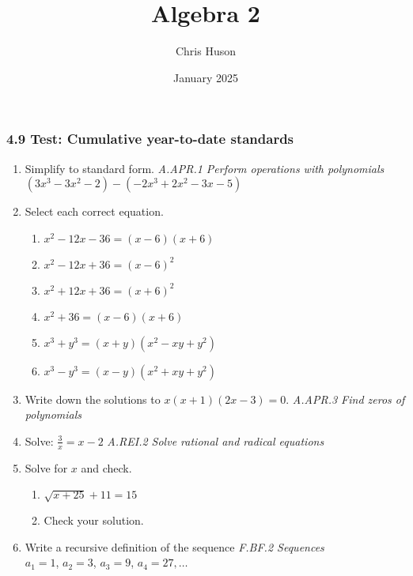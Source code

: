 \documentclass[12pt, twoside]{article}
\title{Algebra 2}
\author{Chris Huson}
\date{January 2025}
\begin{document}
\subsubsection*{4.9 Test: Cumulative year-to-date standards}
\begin{enumerate}[itemsep=0.5cm]

\item Simplify to standard form. \hfill \emph{A.APR.1 Perform operations with polynomials} \\[0.25cm]
$(3x^3 - 3x^2 - 2) - (- 2x^3 + 2x^2 - 3x - 5)$ \vspace{2cm}

\item Select each correct equation.
\begin{multicols}{2}
    \begin{enumerate}
    \item $x^2 - 12x - 36 = (x-6)(x+6)$
    \item $x^2 - 12x + 36 = (x-6)^2$
    \item $x^2 + 12x + 36 = (x+6)^2$
    \item $x^2 + 36 = (x-6)(x+6)$
    \item \(x^3 + y^3 = (x + y)(x^2 - xy + y^2)\)
    \item \(x^3 - y^3 = (x - y)(x^2 + xy + y^2)\)
    \end{enumerate}
\end{multicols}

\item Write down the solutions to $x(x + 1)(2x - 3) = 0$. \hfill \emph{A.APR.3 Find zeros of polynomials}
\vspace{2cm} 

\item Solve: $\displaystyle \frac{3}{x} = x-2$ \hfill \emph{A.REI.2 Solve rational and radical equations} \vspace{3cm} 

\item Solve for $x$ and check.
    \begin{multicols}{2}
    \begin{enumerate}[itemsep=0.5cm]
        \item  $\sqrt{x+25} + 11 = 15$
        \item Check your solution.
    \end{enumerate}
    \end{multicols}

\newpage
\item Write a recursive definition of the sequence \hfill \emph{F.BF.2 Sequences} \\[0.25cm]
$a_1 = 1$, $a_2 = 3$, $a_3 = 9$, $a_4 = 27, \ldots$ \vspace{2.5cm}


\end{enumerate}
\end{document}
